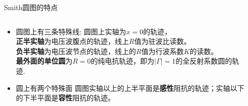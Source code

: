\begin{frame}{Smith圆图的特点}
  \begin{columns}
    \begin{column}{0.4\linewidth}
      \begin{itemize}
        \item 圆图上有三条特殊线:
              \footnotesize{圆图上实轴为$x=0$的轨迹，\\
                \textbf{正半实轴}为电压波腹点的轨迹，线上$R$值为驻波比读数。\\
                \textbf{负半实轴}为电压波节点的轨迹，线上的$R$值为行波系数$K$的读数。\\
                \textbf{最外面的单位圆}为$R=0$的纯电抗轨迹，即为$\lvert\Gamma\rvert=1$的全反射系数圆的轨迹.\\}
        \item 圆上有两个特殊面
              \footnotesize{圆图实轴以上的上半平面是\textbf{感性}阻抗的轨迹；实轴以下的下半平面是\textbf{容性}阻抗的轨迹。}
      \end{itemize}
    \end{column}
    \begin{column}{0.6\linewidth}

\end{column}
\end{columns}
\end{frame}
